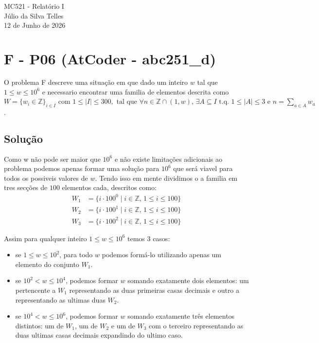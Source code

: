 \documentclass[12pt,a4paper]{article}
\begin{document}
\begin{center}
    {\LARGE MC521 - Relatório I} \\ [2,5em]
    {\large Júlio da Silva Telles} \\ [1,0em]
    {\large 12 de Junho de 2026} \\ [1,5em]
\end{center}

\vspace{1cm} 

\section{F - P06 (AtCoder - abc251\_d)}

O problema F descreve uma situação em que dado um inteiro $w$ tal que $1 \le w \le 10^6$ e necessario encontrar uma
familia de elementos descrita como $W = \{ w_i \in \mathbb{Z} \}_{i \in I} \text{ com } 1 \le|I|
\le 300, \text{ tal que } \forall n \in \mathbb{Z} \cap (1, w), \, \exists A \subseteq I 
\text{ t.q. } 1 \le |A| \le 3 \text{ e } n = \sum_{a \in A} w_a$. 

\subsection{Solução}

Como w não pode ser maior que $10^6$ e não existe limitações adicionais ao problema podemos apenas formar uma solução para $10^6$ 
que será viavel para todos os possiveis valores de $w$. Tendo isso em mente dividimos o a familia em tres secções de $100$ elementos cada,
descritos como:
\begin{align*}
W_1 &= \{ i \cdot 100^0 \mid i \in \mathbb{Z}, \, 1 \le i \le 100 \} \\
W_2 &= \{ i \cdot 100^1 \mid i \in \mathbb{Z}, \, 1 \le i \le 100 \} \\
W_3 &= \{ i \cdot 100^2 \mid i \in \mathbb{Z}, \, 1 \le i \le 100 \}
\end{align*}

Assim para qualquer inteiro $1 \le w \le 10^6$ temos 3 casos:

\begin{itemize}
    \item [a)] se $1 \le w \le 10^2$, para todo $w$ podemos formá-lo utilizando apenas um elemento do conjunto $W_1$.
    
    \item [b)] se $10^2 < w \le 10^4$, podemos formar $w$ somando exatamente dois elementos: um pertencente a $W_1$ 
    representando as duas primeiras casas decimais e outro a representando as ultimas duas $W_2$.
    
    \item [c)] se $10^4 < w \le 10^6$, podemos formar $w$ somando exatamente três elementos distintos: um de $W_1$, 
    um de $W_2$ e um de $W_3$ com o terceiro representando as duas ultimas casas decimais expandindo do ultimo caso.
\end{itemize}
\end{document}

